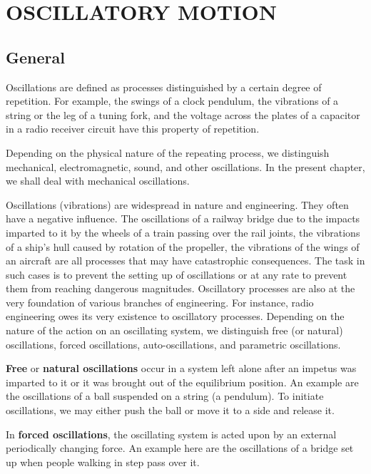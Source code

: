 

\chapter{OSCILLATORY MOTION}\label{chap:7}

\section{General}\label{sec:7_1}

Oscillations are defined as processes distinguished by a certain degree of repetition. For example, the swings of a clock pendulum, the vibrations of a string or the leg of a tuning fork, and the voltage across the plates of a capacitor in a radio receiver circuit have this property of repetition.

Depending on the physical nature of the repeating process, we distinguish mechanical, electromagnetic, sound, and other oscillations. In the present chapter, we shall deal with mechanical oscillations.

Oscillations (vibrations) are widespread in nature and engineering. They often have a negative influence. The oscillations of a railway bridge due to the impacts imparted to it by the wheels of a train passing over the rail joints, the vibrations of a ship's hull caused by rotation of the propeller, the vibrations of the wings of an aircraft are all processes that may have catastrophic consequences. The task in such cases is to prevent the setting up of oscillations or at any rate to prevent them from reaching dangerous magnitudes.
Oscillatory processes are also at the very foundation of various branches of engineering. For instance, radio engineering owes its very existence to oscillatory processes. Depending on the nature of the action on an oscillating system, we distinguish free (or natural) oscillations, forced oscillations, auto-oscillations, and parametric oscillations.

\textbf{Free} or \textbf{natural oscillations} occur in a system left alone after an impetus was imparted to it or it was brought out of the equilibrium position. An example are the oscillations of a ball suspended on a string (a pendulum). To initiate oscillations, we may either push the ball or move it to a side and release it. 

In \textbf{forced oscillations}, the oscillating system is acted upon by an external periodically changing force. An example here are the oscillations of a bridge set up when people walking in step pass over it.

